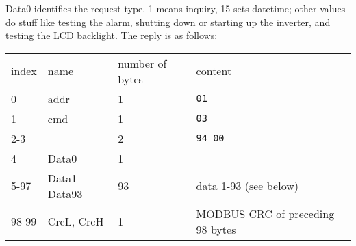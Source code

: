\documentclass[pdftex,oneside,12pt,a4paper]{book}
\begin{document}
Data0 identifies the request type.  1 means inquiry, 15 sets datetime; other values do stuff like testing the alarm, shutting down or starting up the inverter, and testing the LCD backlight.  The reply is as follows:\\
\begin{tabular}{llll}
index & name & number of bytes & content \\
0 & addr & 1 & \verb|01| \\
1 & cmd & 1 & \verb|03| \\
2-3 & & 2 & \verb|94 00| \\
4 & Data0 & 1 & \\
5-97 & Data1-Data93 & 93 & data 1-93 (see below) \\
98-99 & CrcL, CrcH & 1 & MODBUS CRC of preceding 98 bytes 
\end{tabular}
\end{document}
